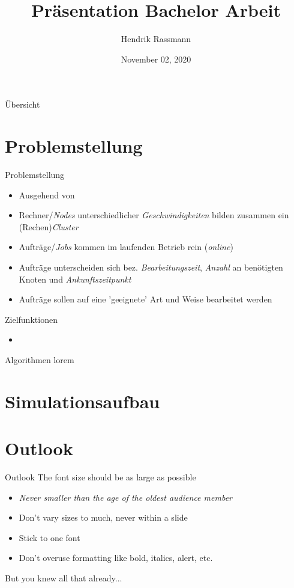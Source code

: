 \documentclass[aspectratio=169,10pt]{beamer}
\title{Präsentation Bachelor Arbeit}
\author{Hendrik Rassmann}
\institute{TU Dortmund University - Department of Computer Science}
\date{November 02, 2020}
\begin{document}
\maketitle

\begin{frame}{Übersicht}
\tableofcontents
\end{frame}



\section{Problemstellung}


\begin{frame}[t,fragile]{Problemstellung}
\begin{itemize}
	\item Ausgehend von
	\item Rechner/\emph{Nodes} unterschiedlicher \emph{Geschwindigkeiten} bilden zusammen ein (Rechen)\emph{Cluster} 
	\item Aufträge/\emph{Jobs} kommen im laufenden Betrieb rein (\emph{online})
	\item Aufträge unterscheiden sich bez. \emph{Bearbeitungszeit}, \emph{Anzahl} an benötigten Knoten und \emph{Ankunftszeitpunkt}
	\item Aufträge sollen auf eine 'geeignete' Art und Weise bearbeitet werden
\end{itemize}
\end{frame}


\begin{frame}[t,fragile]{Zielfunktionen}
\begin{itemize}
	\item \
\end{itemize}
\end{frame}
\begin{frame}[t,fragile]{Algorithmen}
lorem
\end{frame}

\section{Simulationsaufbau}

\section{Outlook}
\begin{frame}{Outlook}
\Large
The font size should be as large as possible
\begin{itemize}
\item \textit{Never smaller than the age of the oldest audience member}
\item Don't vary sizes to much, never within a slide
\item Stick to one font
\item Don't overuse formatting like bold, italics, alert, etc.
\end{itemize}
But you knew all that already...
\end{frame}
\end{document}
